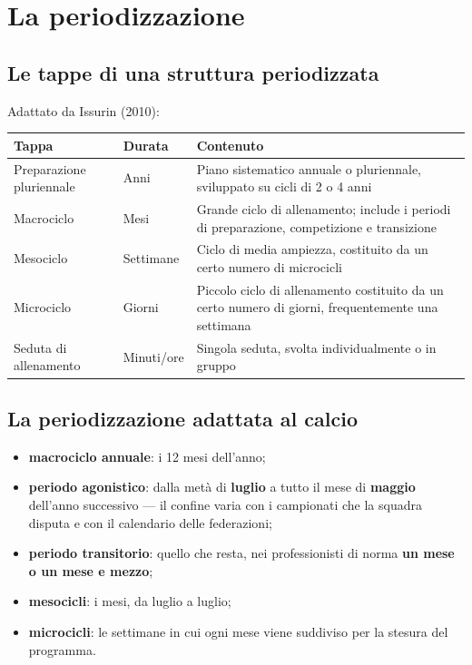 \section{La periodizzazione}

\subsection{Le tappe di una struttura periodizzata}

Adattato da Issurin (2010):

\begin{table}[htbp]
  \centering
  \small
  \renewcommand{\arraystretch}{1.3}
  \begin{tabularx}{\textwidth}{|l|l|X|}
    \hline
    \textbf{Tappa} & \textbf{Durata} & \textbf{Contenuto} \\
    \hline
    Preparazione pluriennale & Anni & Piano sistematico annuale o pluriennale, sviluppato su cicli di
      2 o 4 anni \\
    \hline
    Macrociclo & Mesi & Grande ciclo di allenamento; include i periodi di preparazione, competizione
      e transizione \\
    \hline
    Mesociclo & Settimane & Ciclo di media ampiezza, costituito da un certo numero di microcicli \\
    \hline
    Microciclo & Giorni & Piccolo ciclo di allenamento costituito da un certo numero di giorni,
      frequentemente una settimana \\
    \hline
    Seduta di allenamento & Minuti/ore & Singola seduta, svolta individualmente o in gruppo \\
    \hline
  \end{tabularx}
\end{table}

\subsection{La periodizzazione adattata al calcio}

\begin{itemize}
  \item \textbf{macrociclo annuale}: i 12 mesi dell'anno;
  \item \textbf{periodo agonistico}: dalla metà di \textbf{luglio} a tutto il mese di \textbf{maggio}
    dell'anno successivo --- il confine varia con i campionati che la squadra disputa e con il
    calendario delle federazioni;
  \item \textbf{periodo transitorio}: quello che resta, nei professionisti di norma \textbf{un mese o
    un mese e mezzo};
  \item \textbf{mesocicli}: i mesi, da luglio a luglio;
  \item \textbf{microcicli}: le settimane in cui ogni mese viene suddiviso per la stesura del
    programma.
\end{itemize}

